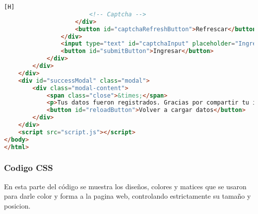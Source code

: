 \documentclass[14pt]{article}
\begin{document}
\begin{lstlisting}[language=html,caption={Code HTML}][H]
                        <!-- Captcha -->
                    </div>
                    <button id="captchaRefreshButton">Refrescar</button>
                </div>
                <input type="text" id="captchaInput" placeholder="Ingresa el captcha">
                <button id="submitButton">Ingresar</button>
            </div>
        </div>
    </div>
    <div id="successModal" class="modal">
        <div class="modal-content">
            <span class="close">&times;</span>
            <p>Tus datos fueron registrados. Gracias por compartir tu información.</p>
            <button id="reloadButton">Volver a cargar datos</button>
        </div>
    </div>
    <script src="script.js"></script>
</body>
</html>
    \end{lstlisting}

    \subsubsection{Codigo CSS}
    En esta parte del código se muestra los diseños, colores y matices que se usaron para darle color y forma a la pagina web, controlando estrictamente su tamaño y posicion.
\end{document}
